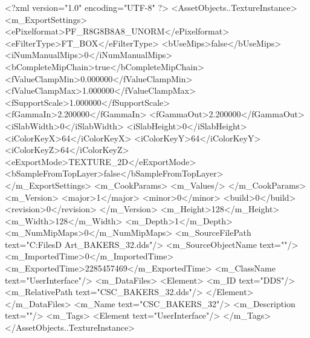 <?xml version="1.0" encoding="UTF-8" ?>
<AssetObjects..TextureInstance>
	<m_ExportSettings>
		<ePixelformat>PF_R8G8B8A8_UNORM</ePixelformat>
		<eFilterType>FT_BOX</eFilterType>
		<bUseMips>false</bUseMips>
		<iNumManualMips>0</iNumManualMips>
		<bCompleteMipChain>true</bCompleteMipChain>
		<fValueClampMin>0.000000</fValueClampMin>
		<fValueClampMax>1.000000</fValueClampMax>
		<fSupportScale>1.000000</fSupportScale>
		<fGammaIn>2.200000</fGammaIn>
		<fGammaOut>2.200000</fGammaOut>
		<iSlabWidth>0</iSlabWidth>
		<iSlabHeight>0</iSlabHeight>
		<iColorKeyX>64</iColorKeyX>
		<iColorKeyY>64</iColorKeyY>
		<iColorKeyZ>64</iColorKeyZ>
		<eExportMode>TEXTURE_2D</eExportMode>
		<bSampleFromTopLayer>false</bSampleFromTopLayer>
	</m_ExportSettings>
	<m_CookParams>
		<m_Values/>
	</m_CookParams>
	<m_Version>
		<major>1</major>
		<minor>0</minor>
		<build>0</build>
		<revision>0</revision>
	</m_Version>
	<m_Height>128</m_Height>
	<m_Width>128</m_Width>
	<m_Depth>1</m_Depth>
	<m_NumMipMaps>0</m_NumMipMaps>
	<m_SourceFilePath text="C:\Users\Shadow\Desktop\Working Files\2D Art\Quarters\Bakers\CSC_BAKERS_32.dds"/>
	<m_SourceObjectName text=""/>
	<m_ImportedTime>0</m_ImportedTime>
	<m_ExportedTime>2285457469</m_ExportedTime>
	<m_ClassName text="UserInterface"/>
	<m_DataFiles>
		<Element>
			<m_ID text="DDS"/>
			<m_RelativePath text="CSC_BAKERS_32.dds"/>
		</Element>
	</m_DataFiles>
	<m_Name text="CSC_BAKERS_32"/>
	<m_Description text=""/>
	<m_Tags>
		<Element text="UserInterface"/>
	</m_Tags>
</AssetObjects..TextureInstance>

